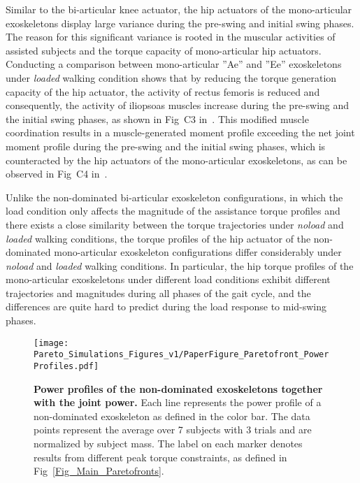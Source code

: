 \documentclass[10pt,letterpaper]{article}
\begin{document}
Similar to the bi-articular knee actuator, the hip actuators of the mono-articular exoskeletons display large variance during the pre-swing and initial swing phases. The reason for this significant variance is rooted in the muscular activities of assisted subjects and the torque capacity of mono-articular hip actuators. Conducting a comparison between mono-articular ''Ae'' and ''Ee'' exoskeletons under \emph{loaded} walking condition shows that by reducing the torque generation capacity of the hip actuator, the activity of rectus femoris is reduced and consequently, the activity of iliopsoas muscles increase during the pre-swing and the initial swing phases, as shown in Fig~C3 in~. This modified muscle coordination results in a muscle-generated moment profile exceeding the net joint moment profile during the pre-swing and the initial swing phases, which is counteracted by the hip actuators of the mono-articular exoskeletons, as can be observed in Fig~C4 in~.

Unlike the non-dominated bi-articular exoskeleton configurations, in which the load condition only affects the magnitude of the assistance torque profiles and there exists a close similarity between the torque trajectories under \emph{noload} and \emph{loaded} walking conditions, the torque profiles of the hip actuator of the non-dominated mono-articular exoskeleton configurations differ considerably under \emph{noload} and \emph{loaded} walking conditions. In particular, the hip torque profiles of the mono-articular exoskeletons under different load conditions exhibit different trajectories and magnitudes during all phases of the gait cycle, and the differences are quite hard to predict during the load response to mid-swing phases.

\begin{figure*}[h!]
	\centering
	\texttt{[image: Pareto\_Simulations\_Figures\_v1/PaperFigure\_Paretofront\_PowerProfiles.pdf]}
	\vspace{-4mm}
		\caption{{\small\textbf{Power profiles of the non-dominated exoskeletons together with the joint power.} Each line represents the power profile of a non-dominated exoskeleton as defined in the color bar. The data points represent the average over 7 subjects with 3 trials and are normalized by subject mass. The label on each marker denotes results from different peak torque constraints, as defined in Fig~\ref{Fig_Main_Paretofronts}.} }
	\label{Fig_Paretofronts_Power_Profiles}
\end{figure*}
\end{document}
